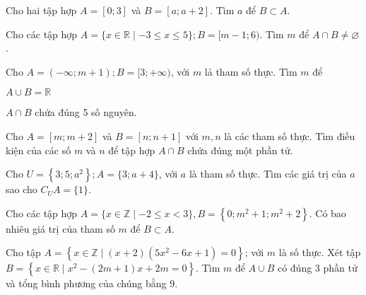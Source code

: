 \begin{bt}%
	Cho hai tập hợp $A=[0;3]$ và $B=[a;a+2]$. Tìm $a$ để $B\subset A$.
\end{bt}

\begin{bt}
	Cho các tập hợp $A=\{x \in \mathbb{R} \mid-3 \leq x \leq 5\} ; B=[m-1 ; 6)$. Tìm $m$ để $A \cap B \neq \varnothing$.
\end{bt}

\begin{bt}
	Cho $A=(-\infty ; m+1) ; B=[3 ;+\infty)$, với $m$ lả tham số thực. Tìm $m$ để
	\begin{enumEX}[a)]{1}
		\item $A \cup B=\mathbb{R}$
		\item $A \cap B$ chứa đúng 5 số nguyên.
	\end{enumEX}
\end{bt}

\begin{bt}
	Cho $A=[m ; m+2]$ và $B=[n ; n+1]$ với $m, n$ là các tham số thực. Tìm điều kiện của các số $m$ và $n$ để tập hợp $A \cap B$ chứa đúng một phần tử.
\end{bt}

\begin{bt}
	Cho $U=\left\{3 ; 5 ; a^{2}\right\} ; A=\{3 ; a+4\}$, với $a$ là tham số thực. Tìm các giá trị của $a$ sao cho $C_{U} A=\{1\}$.
\end{bt}

\begin{bt}
	Cho các tập hợp $A=\{x \in \mathbb{Z} \mid-2 \leq x<3\}, B=\left\{0 ; m^{2}+1 ; m^{2}+2\right\}$. Có bao nhiêu giá trị của tham số $m$ để $B \subset A$.
\end{bt}

\begin{bt}
	Cho tập $A=\left\{x \in \mathbb{Z} \mid(x+2)\left(5 x^{2}-6 x+1\right)=0\right\}$; với $m$ là số thực. Xét tập $B=\left\{x \in \mathbb{R} \mid x^{2}-(2 m+1) x+2 m=0\right\}$. Tìm $m$ để $A \cup B$ có đúng 3 phần tử và tổng bình phương của chúng bằng $9$.
\end{bt}

